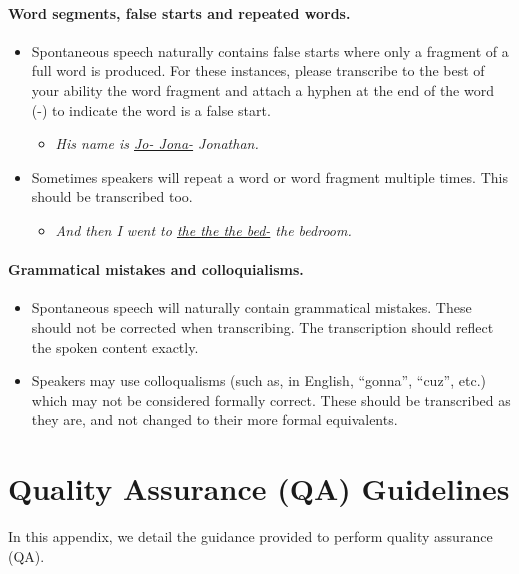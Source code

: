 \paragraph{Word segments, false starts and repeated words.} \begin{itemize}
    \item Spontaneous speech naturally contains false starts where only a fragment of a full word is produced. For these instances, please transcribe to the best of your ability the word fragment and attach a hyphen at the end of the word (-) to indicate the word is a false start. 
    \begin{itemize}
        \item \textit{His name is \underline{Jo- Jona-} Jonathan.}
    \end{itemize}
    \item Sometimes speakers will repeat a word or word fragment multiple times. This should be transcribed too.
    \begin{itemize}
        \item \textit{And then I went to \underline{the the the bed-} the bedroom.}
    \end{itemize}

\end{itemize}


\paragraph{Grammatical mistakes and colloquialisms.}
\begin{itemize}
    \item Spontaneous speech will naturally contain grammatical mistakes. These should not be corrected when transcribing. The transcription should reflect the spoken content exactly.
    \item Speakers may use colloqualisms (such as, in English, “gonna”, “cuz”, etc.) which may not be considered formally correct. These should be transcribed as they are, and not changed to their more formal equivalents.
\end{itemize}

\section{Quality Assurance (QA) Guidelines}\label{appx:guideline:qa}
In this appendix, we detail the guidance provided to perform quality assurance (QA).
